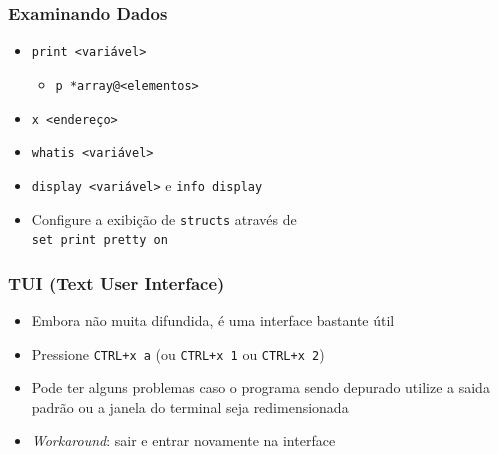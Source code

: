 \documentclass[xcolor=pdftex,dvipsnames,table,t]{beamer}
\begin{document}
\begin{frame}[fragile]
	\frametitle{Examinando Dados}
	  \begin{itemize}
	    \item{\verb|print <variável>|}
	    \begin{itemize}
	      \item{\verb|p *array@<elementos>|}
	    \end{itemize}
	    \item{\verb|x <endereço>|}
	    \item{\verb|whatis <variável>|}
	    \item{\verb|display <variável>| e \verb|info display|}
	    \item{Configure a exibição de \verb|structs| através de \\
		  \verb|set print pretty on|}
	  \end{itemize}
\end{frame}

\begin{frame}[fragile]
	\frametitle{TUI (Text User Interface)}
	  \begin{itemize}
	    \item{Embora não muita difundida, é uma interface bastante útil}
	    \item{Pressione \verb|CTRL+x a| (ou \verb|CTRL+x 1| ou \verb|CTRL+x 2|)}
	    \item{Pode ter alguns problemas caso o programa sendo depurado utilize a saida padrão ou a janela do terminal seja redimensionada}
	    \item{\textit{Workaround}: sair e entrar novamente na interface}
	  \end{itemize}
\end{frame}
\end{document}
